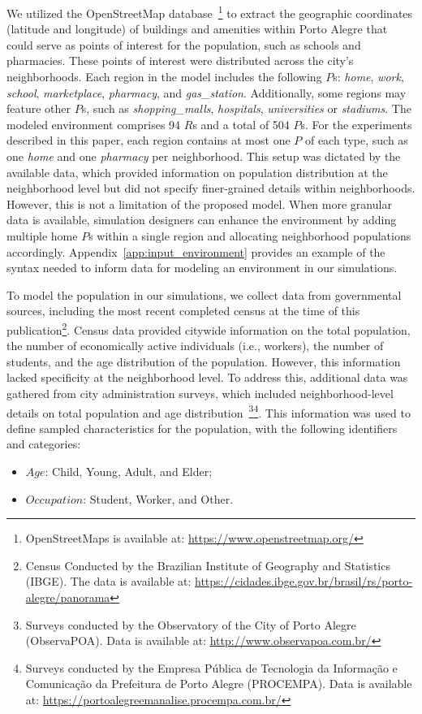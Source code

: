 \documentclass[pdflatex,sn-mathphys-num]{sn-jnl}%
\theoremstyle{thmstyleone}%
\theoremstyle{thmstyletwo}%
\theoremstyle{thmstylethree}%
\begin{document}
We utilized the OpenStreetMap database~\footnote{OpenStreetMaps is available at: \url{https://www.openstreetmap.org/}} to extract the geographic coordinates (latitude and longitude) of buildings and amenities within Porto Alegre that could serve as points of interest for the population, such as schools and pharmacies.
These points of interest were distributed across the city's neighborhoods. Each region in the model includes the following $P$s: \textit{home}, \textit{work}, \textit{school}, \textit{marketplace}, \textit{pharmacy}, and \textit{gas\_station}. Additionally, some regions may feature other $P$s, such as \textit{shopping\_malls}, \textit{hospitals}, \textit{universities} or \textit{stadiums}.
The modeled environment comprises 94 $R$s and a total of 504 $P$s. For the experiments described in this paper, each region contains at most one $P$ of each type, such as one \textit{home} and one \textit{pharmacy} per neighborhood. This setup was dictated by the available data, which provided information on population distribution at the neighborhood level but did not specify finer-grained details within neighborhoods. However, this is not a limitation of the proposed model. When more granular data is available, simulation designers can enhance the environment by adding multiple home $P$s within a single region and allocating neighborhood populations accordingly. Appendix~\ref{app:input_environment} provides an example of the syntax needed to inform data for modeling an environment in our simulations.

To model the population in our simulations, we collect data from governmental sources, including the most recent completed census at the time of this publication\footnote{Census Conducted by the Brazilian Institute of Geography and Statistics (IBGE). The data is available at:  \url{https://cidades.ibge.gov.br/brasil/rs/porto-alegre/panorama}}. Census data provided citywide information on the total population, the number of economically active individuals (i.e., workers), the number of students, and the age distribution of the population. However, this information lacked specificity at the neighborhood level.
To address this, additional data was gathered from city administration surveys, which included neighborhood-level details on total population and age distribution~\footnote{Surveys conducted by the Observatory of the City of Porto Alegre (ObservaPOA). Data is available at: \url{http://www.observapoa.com.br/}}\footnote{Surveys conducted by the Empresa Pública de Tecnologia da Informação e Comunicação da Prefeitura de Porto Alegre (PROCEMPA). Data is available at: \url{https://portoalegreemanalise.procempa.com.br/}}.
This information was used to define sampled characteristics for the population, with the following identifiers and categories:
\begin{itemize}
    \item $Age$: Child, Young, Adult, and Elder;
    \item $Occupation$: Student, Worker, and Other.
\end{itemize}
\end{document}
